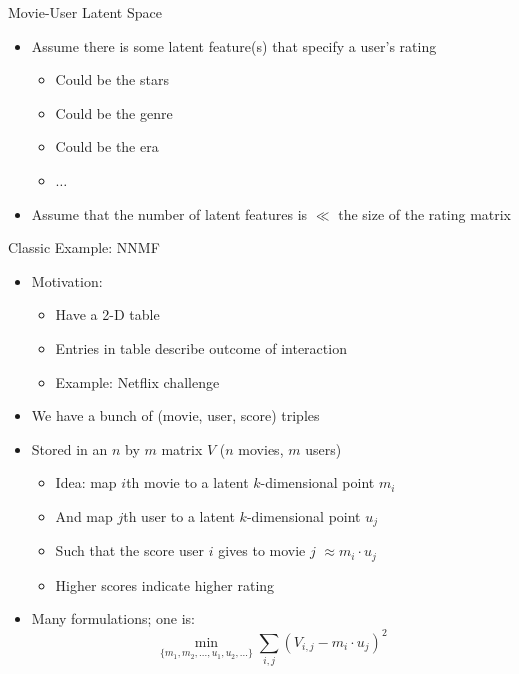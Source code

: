 \documentclass[aspectratio=169]{beamer}
\begin{document}
\begin{frame}{Movie-User Latent Space}
\begin{itemize}
\item Assume there is some latent feature(s) that specify a user's rating
\begin{itemize}
\item Could be the stars
\item Could be the genre
\item Could be the era
\item $\ldots$
\end{itemize}
\item Assume that the number of latent features is $\ll$ the size of the rating matrix
\end{itemize}

\end{frame}
\begin{frame}{Classic Example: NNMF}

\begin{itemize}
\item Motivation:
\begin{itemize}
\item Have a 2-D table
\item Entries in table describe outcome of interaction
\item Example: Netflix challenge
\end{itemize}
\item We have a bunch of (movie, user, score) triples
\item Stored in an $n$ by $m$ matrix $V$ ($n$ movies, $m$ users)
\begin{itemize}
	\item Idea: map $i$th movie to a latent $k$-dimensional point $m_i$
	\item And map $j$th user to a latent $k$-dimensional point $u_j$
	\item Such that the score user $i$ gives to movie $j$ $\approx m_i \cdot u_j$
	\item Higher scores indicate higher rating
\end{itemize}
\item Many formulations; one is:
	$$ \min_{\{m_1, m_2, ..., u_1, u_2, ...\}} \sum_{i, j} (V_{i,j} - m_i \cdot u_j)^2$$
\end{itemize}

\end{frame}
\end{document}
